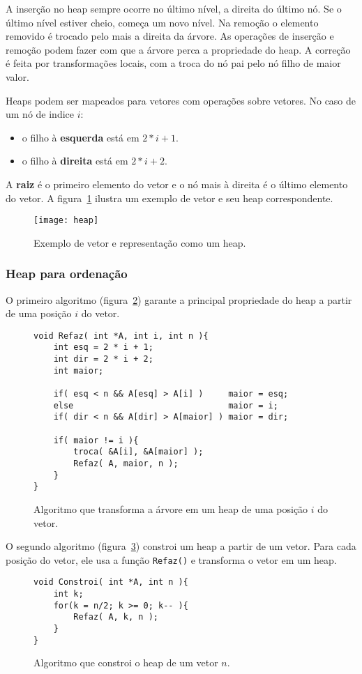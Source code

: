A inserção no heap sempre ocorre no último nível, a direita do último nó.
Se o último nível estiver cheio, começa um novo nível. 
Na remoção o elemento removido é trocado pelo mais a direita da árvore.
As operações de inserção e remoção podem fazer com que a árvore perca a
propriedade do heap.  A correção é feita por transformações locais, com a troca
do nó pai pelo nó filho de maior valor.

Heaps podem ser mapeados para vetores com operações sobre vetores.
No caso de um nó de indice $i$:
\begin{itemize}
\item o filho à {\bf esquerda} está em $2*i+1$.
\item o filho à {\bf direita} está em $2*i+2$.
\end{itemize}
A {\bf raiz} é o primeiro elemento do vetor e o nó mais à direita é o último
elemento do vetor.
A figura~\ref{aula03:fig:heap} ilustra um exemplo de vetor e seu heap correspondente.
%
\begin{figure}[ht]
\centering
\texttt{[image: heap]}
\caption{Exemplo de vetor e representação como um heap.}
\label{aula03:fig:heap}
\end{figure}

\subsubsection*{Heap para ordenação}

O primeiro algoritmo (figura~\ref{aula03:algo:heap:refaz}) garante a principal
propriedade do heap a partir de uma posição $i$ do vetor.
%
\begin{figure}[!htb]
\centering
\begin{framed}
\begin{lstlisting}
void Refaz( int *A, int i, int n ){
	int esq = 2 * i + 1;
	int dir = 2 * i + 2;
	int maior;

	if( esq < n && A[esq] > A[i] )     maior = esq;
	else                               maior = i;
	if( dir < n && A[dir] > A[maior] ) maior = dir;

	if( maior != i ){
		troca( &A[i], &A[maior] );
		Refaz( A, maior, n );
	}
}
\end{lstlisting}
\end{framed}
\caption{Algoritmo que transforma a árvore em um heap de uma posição $i$ do vetor.}
\label{aula03:algo:heap:refaz}
\end{figure}

O segundo algoritmo (figura~\ref{aula03:algo:heap:constroi}) constroi
um heap a partir de um vetor. 
Para cada posição do vetor, ele usa a função \lstinline{Refaz()} e transforma
o vetor em um heap.
%
\begin{figure}[!htb]
\centering
\begin{framed}
\begin{lstlisting}
void Constroi( int *A, int n ){
	int k;
	for(k = n/2; k >= 0; k-- ){
		Refaz( A, k, n );
	}
}
\end{lstlisting}
\end{framed}
\caption{Algoritmo que constroi o heap de um vetor $n$.}
\label{aula03:algo:heap:constroi}
\end{figure}

